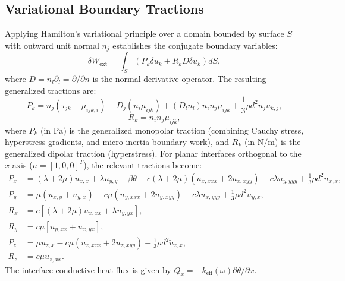 \documentclass[11pt,a4paper]{article}
\begin{document}
\subsection{Variational Boundary Tractions}
Applying Hamilton's variational principle over a domain bounded by surface $S$ with outward unit normal $n_j$ establishes the conjugate boundary variables:
\begin{equation}
\delta W_{\text{ext}} = \int_S \left( P_k \delta u_k + R_k D \delta u_k \right) dS,
\label{eq:hamilton_work}
\end{equation}
where $D = n_l \partial_l = \partial / \partial n$ is the normal derivative operator. The resulting generalized tractions are:
\begin{equation}
P_k = n_j (\tau_{jk} - \mu_{ijk,i}) - D_j(n_i \mu_{ijk}) + (D_l n_l) n_i n_j \mu_{ijk} + \frac{1}{3}\rho d^2 n_j \ddot{u}_{k,j},
\label{eq:monopolar_traction}
\end{equation}
\begin{equation}
R_k = n_i n_j \mu_{ijk},
\label{eq:dipolar_traction}
\end{equation}
where $P_k$ (in $\text{Pa}$) is the generalized monopolar traction (combining Cauchy stress, hyperstress gradients, and micro-inertia boundary work), and $R_k$ (in $\text{N/m}$) is the generalized dipolar traction (hyperstress). For planar interfaces orthogonal to the $x$-axis ($n = [1, 0, 0]^T$), the relevant tractions become:
\begin{equation}
\begin{aligned}
P_x &= (\lambda+2\mu) u_{x,x} + \lambda u_{y,y} - \beta \theta - c(\lambda+2\mu)\left( u_{x,xxx} + 2 u_{x,xyy} \right) - c\lambda u_{y,yyy} + \frac{1}{3}\rho d^2 \ddot{u}_{x,x}, \\
P_y &= \mu (u_{x,y} + u_{y,x}) - c\mu \left( u_{y,xxx} + 2 u_{y,xyy} \right) - c\lambda u_{x,yyy} + \frac{1}{3}\rho d^2 \ddot{u}_{y,x}, \\
R_x &= c \left[ (\lambda+2\mu) u_{x,xx} + \lambda u_{y,yx} \right], \\
R_y &= c\mu \left[ u_{y,xx} + u_{x,yx} \right], \\
P_z &= \mu u_{z,x} - c\mu \left( u_{z,xxx} + 2 u_{z,xyy} \right) + \frac{1}{3}\rho d^2 \ddot{u}_{z,x}, \\
R_z &= c\mu u_{z,xx}.
\end{aligned}
\label{eq:interface_tractions}
\end{equation}
The interface conductive heat flux is given by $Q_x = -k_{\text{eff}}(\omega) \partial \theta / \partial x$.
\end{document}
